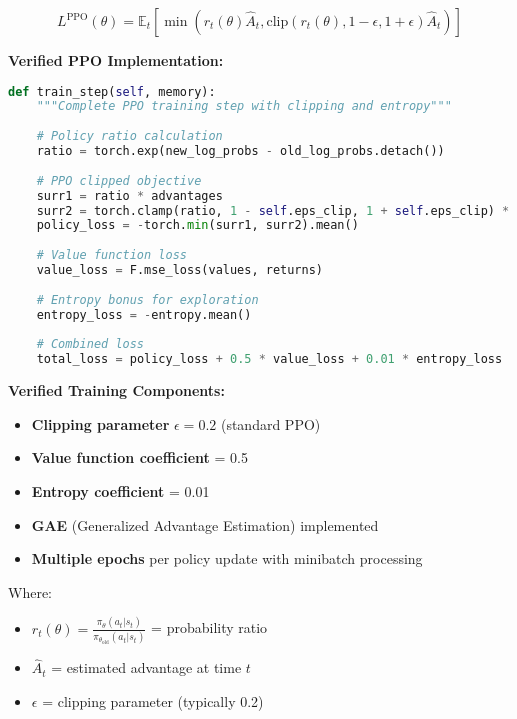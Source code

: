 \documentclass[12pt,a4paper]{article}
\begin{document}
\begin{equation}
L^{\text{PPO}}(\theta) = \mathbb{E}_t\left[\min\left(r_t(\theta)\hat{A}_t, \text{clip}(r_t(\theta), 1-\epsilon, 1+\epsilon)\hat{A}_t\right)\right]
\end{equation}

\textbf{Verified PPO Implementation:}
\begin{lstlisting}[language=Python, caption=PPO Trainer Implementation (cyberwheel/data/models/trainer.py)]
def train_step(self, memory):
    """Complete PPO training step with clipping and entropy"""
    
    # Policy ratio calculation
    ratio = torch.exp(new_log_probs - old_log_probs.detach())
    
    # PPO clipped objective
    surr1 = ratio * advantages
    surr2 = torch.clamp(ratio, 1 - self.eps_clip, 1 + self.eps_clip) * advantages
    policy_loss = -torch.min(surr1, surr2).mean()
    
    # Value function loss
    value_loss = F.mse_loss(values, returns)
    
    # Entropy bonus for exploration
    entropy_loss = -entropy.mean()
    
    # Combined loss
    total_loss = policy_loss + 0.5 * value_loss + 0.01 * entropy_loss
\end{lstlisting}

\textbf{Verified Training Components:}
\begin{itemize}
    \item \textbf{Clipping parameter} $\epsilon = 0.2$ (standard PPO)
    \item \textbf{Value function coefficient} = 0.5
    \item \textbf{Entropy coefficient} = 0.01
    \item \textbf{GAE} (Generalized Advantage Estimation) implemented
    \item \textbf{Multiple epochs} per policy update with minibatch processing
\end{itemize}

Where:
\begin{itemize}
    \item $r_t(\theta) = \frac{\pi_\theta(a_t|s_t)}{\pi_{\theta_{\text{old}}}(a_t|s_t)}$ = probability ratio
    \item $\hat{A}_t$ = estimated advantage at time $t$
    \item $\epsilon$ = clipping parameter (typically 0.2)
\end{itemize}
\end{document}
